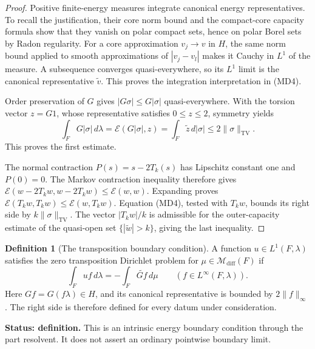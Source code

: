 \documentclass[11pt,a4paper]{article}
\numberwithin{equation}{section}
\theoremstyle{definition}
\newtheorem{definition}[theorem]{Definition}
\theoremstyle{remark}
\begin{document}
\begin{proof}
Positive finite-energy measures integrate canonical energy
representatives.  To recall the justification, their core norm
bound and the compact-core capacity formula show that they
vanish on polar compact sets, hence on polar Borel sets by Radon
regularity.  For a core approximation $v_j\to v$ in $H$,
the same norm bound applied to smooth approximations of
$|v_j-v_l|$ makes it Cauchy in $L^1$ of the measure.
A subsequence converges quasi-everywhere, so its $L^1$ limit is
the canonical representative $\widetilde v$.
This proves the integration interpretation in (MD4).

Order preservation of $G$ gives
$|G\sigma|\leq G|\sigma|$ quasi-everywhere.  With the torsion
vector $z=G1$, whose representative satisfies $0\leq z\leq2$,
symmetry yields
\[
 \int_FG|\sigma|\,d\lambda
       =\mathcal E(G|\sigma|,z)
       =\int_F\widetilde z\,d|\sigma|
       \leq2\|\sigma\|_{\mathrm{TV}}.
 \tag{MD6}
\]
This proves the first estimate.

The normal contraction $P(s)=s-2T_k(s)$ has Lipschitz constant
one and $P(0)=0$.  The Markov contraction inequality therefore
gives
$\mathcal E(w-2T_kw,w-2T_kw)\leq\mathcal E(w,w)$.
Expanding proves
$\mathcal E(T_kw,T_kw)\leq\mathcal E(w,T_kw)$.
Equation (MD4), tested with $T_kw$, bounds its right side by
$k\|\sigma\|_{\mathrm{TV}}$.  The vector $|T_kw|/k$ is
admissible for the outer-capacity estimate of the quasi-open
set $\{|\widetilde w|>k\}$, giving the last inequality.
\end{proof}

\begin{definition}[The transposition boundary condition]
\label{def:r11-transposition-boundary}
A function $u\in L^1(F,\lambda)$ satisfies the zero transposition
Dirichlet problem for $\mu\in\mathcal M_{\mathrm{diff}}(F)$ if
\[
             \int_Fu f\,d\lambda
                   =-\int_F\widetilde{Gf}\,d\mu
                        \qquad(f\in L^\infty(F,\lambda)).
 \tag{MD7}
\]
Here $Gf=G(f\lambda)\in H$, and its canonical representative is
bounded by $2\|f\|_\infty$.  The right side is therefore defined
for every datum under consideration.
\end{definition}

\noindent\textbf{Status: definition.}
This is an intrinsic energy boundary condition through the
part resolvent.  It does not assert an ordinary pointwise
boundary limit.
\end{document}
